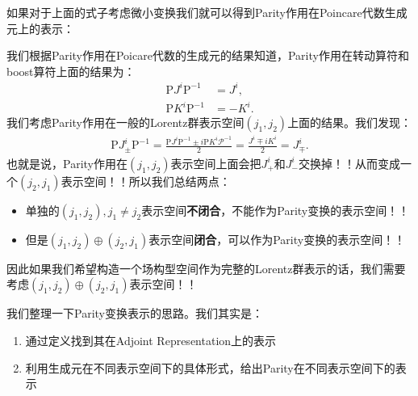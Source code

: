     如果对于上面的式子考虑微小变换我们就可以得到Parity作用在Poincare代数生成元上的表示：

    \bigskip

    我们根据Parity作用在Poicare代数的生成元的结果知道，Parity作用在转动算符和boost算符上面的结果为：
    \begin{align}
      \mathrm{P} J^i \mathrm{P}^{-1} &= J^i, \\
      \mathrm{P} K^i \mathrm{P}^{-1} &= -K^i.
    \end{align}
    我们考虑Parity作用在一般的Lorentz群表示空间$ (j_1,j_2) $上面的结果。我们发现：
    \begin{align}
      \mathrm{P} J_\pm^i \mathrm{P}^{-1} = \frac{\mathrm{P} J^i
      \mathrm{P}^{-1} \pm i \mathrm{P} K^i \mathcal{P}^{-1}}{2} =
      \frac{J^i \mp i K^i}{2} = J_\mp^i.
    \end{align}
    也就是说，Parity作用在$ (j_1,j_2) $表示空间上面会把$ J_+^i $和$ J_-^i
    $交换掉！！从而变成一个$ (j_2,j_1) $表示空间！！所以我们总结两点：
    \begin{itemize}
      \item 单独的$ (j_1,j_2) , j_1 \neq j_2$表示空间\textbf{不闭合}，不能作为Parity变换的表示空间！！
      \item 但是$ (j_1,j_2) \oplus (j_2,j_1) $表示空间\textbf{闭合}，可以作为Parity变换的表示空间！！
    \end{itemize}
    因此如果我们希望构造一个场构型空间作为完整的Lorentz群表示的话，我们需要考虑$ (j_1,j_2) \oplus
    (j_2,j_1) $表示空间！！

    \bigskip

    我们整理一下Parity变换表示的思路。我们其实是：
    \begin{enumerate}
      \item 通过定义找到其在Adjoint Representation上的表示
      \item 利用生成元在不同表示空间下的具体形式，给出Parity在不同表示空间下的表示
    \end{enumerate}

